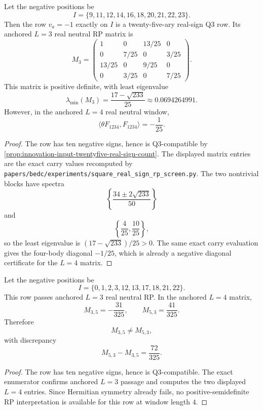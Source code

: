 \begin{proposition}
\label{prop:innovation-input-twentyfive-strict-lthree-fourbody-failure}
Let the negative positions be
$$
I=\{9,11,12,14,16,18,20,21,22,23\}.
$$
Then the row $v_a=-1$ exactly on $I$ is a twenty-five-ary real-sign Q3
row. Its anchored $L=3$ real neutral RP matrix is
$$
M_3
=
\begin{pmatrix}
1&0&13/25&0\\
0&7/25&0&3/25\\
13/25&0&9/25&0\\
0&3/25&0&7/25
\end{pmatrix}.
$$
This matrix is positive definite, with least eigenvalue
$$
\lambda_{\min}(M_3)
=
\frac{17-\sqrt{233}}{25}
\approx
0.0694264991.
$$
However, in the anchored $L=4$ real neutral window,
$$
\langle\theta F_{1234},F_{1234}\rangle=-\frac1{25}.
$$
\end{proposition}

\begin{proof}
The row has ten negative signs, hence is Q3-compatible by
\autoref{prop:innovation-input-twentyfive-real-sign-count}. The displayed
matrix entries are the exact carry values recomputed by
\texttt{papers/bedc/experiments/square\_real\_sign\_rp\_screen.py}. The
two nontrivial blocks have spectra
$$
\left\{\frac{34\pm2\sqrt{233}}{50}\right\}
$$
and
$$
\left\{\frac4{25},\frac{10}{25}\right\},
$$
so the least eigenvalue is $(17-\sqrt{233})/25>0$. The same exact carry
evaluation gives the four-body diagonal $-1/25$, which is already a
negative diagonal certificate for the $L=4$ matrix.
\end{proof}

\begin{proposition}
\label{prop:innovation-input-twentyfive-near-hermitian-failure}
Let the negative positions be
$$
I=\{0,1,2,3,12,13,17,18,21,22\}.
$$
This row passes anchored $L=3$ real neutral RP. In the anchored $L=4$
matrix,
$$
M_{3,5}=-\frac{31}{325},
\qquad
M_{5,3}=\frac{41}{325}.
$$
Therefore
$$
M_{3,5}\ne M_{5,3},
$$
with discrepancy
$$
M_{5,3}-M_{3,5}=\frac{72}{325}.
$$
\end{proposition}

\begin{proof}
The row has ten negative signs, hence is Q3-compatible. The exact
enumerator confirms anchored $L=3$ passage and computes the two displayed
$L=4$ entries. Since Hermitian symmetry already fails, no
positive-semidefinite RP interpretation is available for this row at
window length $4$.
\end{proof}

